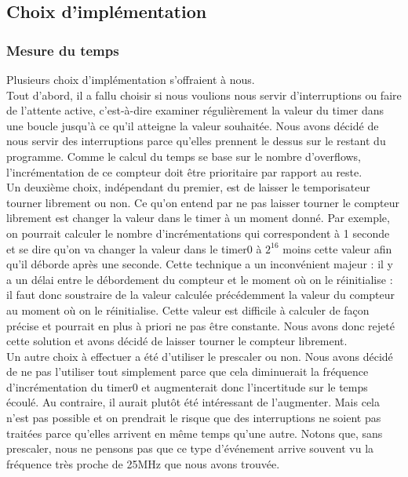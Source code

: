 \documentclass[12pt,a4paper]{article}
\begin{document}
    \subsection{Choix d'implémentation}
    
    \subsubsection{Mesure du temps}
    
    Plusieurs choix d'implémentation s'offraient à nous.\\
    
    Tout d'abord, il a fallu choisir si nous voulions nous servir d'interruptions ou faire de l'attente active, c'est-à-dire examiner régulièrement la valeur du timer dans une boucle jusqu'à ce qu'il atteigne la valeur souhaitée. Nous avons décidé de nous servir des interruptions parce qu'elles prennent le dessus sur le restant du programme. Comme le calcul du temps se base sur le nombre d'overflows, l'incrémentation de ce compteur doit être prioritaire par rapport au reste.\\
    
    Un deuxième choix, indépendant du premier, est de laisser le temporisateur tourner librement ou non. Ce qu'on entend par ne pas laisser tourner le compteur librement est changer la valeur dans le timer à un moment donné. Par exemple, on pourrait calculer le nombre d'incrémentations qui correspondent à 1 seconde et se dire qu'on va changer la valeur dans le timer0 à $2^{16}$ moins cette valeur afin qu'il déborde après une seconde. Cette technique a un inconvénient majeur : il y a un délai entre le débordement du compteur et le moment où on le réinitialise : il faut donc soustraire de la valeur calculée précédemment la valeur du compteur au moment où on le réinitialise. Cette valeur est difficile à calculer de façon précise et pourrait en plus à priori ne pas être constante. Nous avons donc rejeté cette solution et avons décidé de laisser tourner le compteur librement.\\
    
    Un autre choix à effectuer a été d'utiliser le prescaler ou non. Nous avons décidé de ne pas l'utiliser tout simplement parce que cela diminuerait la fréquence d'incrémentation du timer0 et augmenterait donc l'incertitude sur le temps écoulé. Au contraire, il aurait plutôt été intéressant de l'augmenter. Mais cela n'est pas possible et on prendrait le risque que des interruptions ne soient pas traitées parce qu'elles arrivent en même temps qu'une autre. Notons que, sans prescaler, nous ne pensons pas que ce type d'événement arrive souvent vu la fréquence très proche de \unit{25}{MHz} que nous avons trouvée. \\
    
\end{document}
